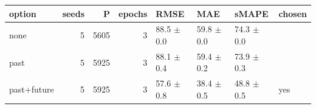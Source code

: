 \begin{tabular}{lrrrllll}
\toprule
option & seeds & P & epochs & RMSE & MAE & sMAPE & chosen \\
\midrule
none & 5 & 5605 & 3 & 88.5 $\pm$ 0.0 & 59.8 $\pm$ 0.0 & 74.3 $\pm$ 0.0 &  \\
past & 5 & 5925 & 3 & 88.1 $\pm$ 0.4 & 59.4 $\pm$ 0.2 & 73.9 $\pm$ 0.3 &  \\
past+future & 5 & 5925 & 3 & 57.6 $\pm$ 0.8 & 38.4 $\pm$ 0.5 & 48.8 $\pm$ 0.5 & yes \\
\bottomrule
\end{tabular}
